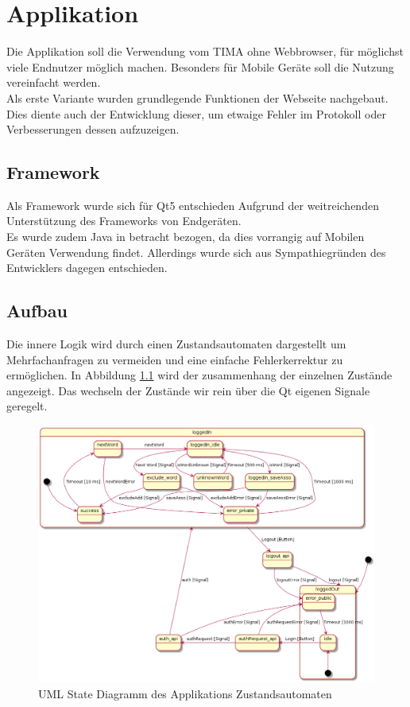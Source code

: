 \chapter{Applikation}
Die Applikation soll die Verwendung vom TIMA ohne Webbrowser, für möglichst
viele Endnutzer möglich machen.  Besonders für Mobile Geräte soll die Nutzung
vereinfacht werden.\\ Als erste Variante wurden grundlegende Funktionen der
Webseite nachgebaut.  Dies diente auch der Entwicklung dieser, um etwaige
Fehler im Protokoll oder Verbesserungen dessen aufzuzeigen.

\section{Framework}
Als Framework wurde sich für Qt5 entschieden Aufgrund der weitreichenden
Unterstützung des Frameworks von Endgeräten.\\ Es wurde zudem Java in betracht
bezogen, da dies vorrangig auf Mobilen Geräten Verwendung findet. Allerdings
wurde sich aus Sympathiegründen des Entwicklers dagegen entschieden.

\section{Aufbau}
Die innere Logik wird durch einen Zustandsautomaten dargestellt um
Mehrfachanfragen zu vermeiden und eine einfache Fehlerkerrektur zu ermöglichen.
In Abbildung \ref{fig:uml_automata} wird der zusammenhang der einzelnen
Zustände angezeigt. Das wechseln der Zustände wir rein über die Qt eigenen
Signale geregelt.
\begin{figure}[!h]
	\centering
	\includegraphics[width=\textwidth]{../UML/app_automata.png}
	\caption{UML State Diagramm des Applikations Zustandsautomaten}
	\label{fig:uml_automata}
\end{figure}

